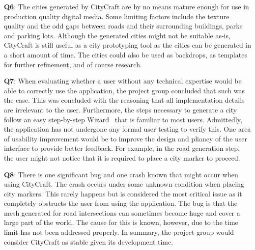 \textbf{Q6}:
The cities generated by CityCraft are by no means mature enough for use in production quality digital media.
Some limiting factors include the texture quality and the odd gaps between roads and their surrounding buildings, parks and parking lots.
Although the generated cities might not be suitable as-is, CityCraft is still useful as a city prototyping tool as the cities can be generated in a short amount of time.
The cities could also be used as backdrops, as templates for further refinement, and of course research.

\textbf{Q7}:
When evaluating whether a user without any technical expertise would be able to correctly use the application, the project group concluded that such was the case.
This was concluded with the reasoning that all implementation details are irrelevant to the user.
Furthermore, the steps necessary to generate a city follow an easy step-by-step Wizard~\cite{yer_a_wizard} that is familiar to most users.
Admittedly, the application has not undergone any formal user testing to verify this.
One area of usability improvement would be to improve the design and pliancy of the user interface to provide better feedback.
For example, in the road generation step, the user might not notice that it is required to place a city marker to proceed.

\textbf{Q8}:
There is one significant bug and one crash known that might occur when using CityCraft.
The crash occurs under some unknown condition when placing city markers.
This rarely happens but is considered the most critical issue as it completely obstructs the user from using the application.
The bug is that the mesh generated for road intersections can sometimes become huge and cover a large part of the world.
The cause for this is known, however, due to the time limit has not been addressed properly.
In summary, the project group would consider CityCraft as stable given its development time.